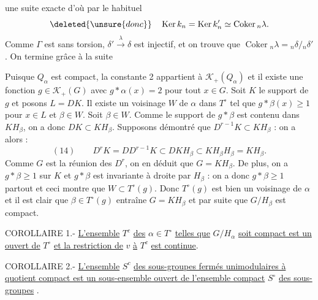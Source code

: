 une suite exacte
d'où par le  habituel
\[
\deleted{\unsure{donc}}\quad \operatorname{Ker}k_n=\operatorname{Ker}k'_n\simeq\operatorname{Coker}{}_n\lambda.
\]
Comme $\Gamma$ est sans torsion,  $\delta'\xrightarrow{\lambda}\delta$ est injectif, et on trouve que $\operatorname{Coker}{}_n\lambda={}_n\delta/{}_n\delta'$. On termine grâce à la suite

Puisque $Q_\alpha$ est compact, la constante 2 appartient à $\mathcal K_+(Q_\alpha)$ et il existe une fonction $g\in\mathcal K_+(G)$ avec $g*\alpha(x)=2$ pour tout $x\in G$. Soit $K$ le support de $g$ et posons $L=DK$. Il existe un voisinage $W$ de $\alpha$ dans $T^\circ$ tel que $g*\beta(x)\geq 1$ pour $x\in L$ et $\beta\in W$. Soit $\beta\in W$. Comme le support de $g*\beta$ est contenu dans $KH_\beta$, on a donc $DK\subset KH_\beta$. Supposons démontré que $D^{r-1}K\subset KH_\beta$ : on a alors :
\[
(14)\qquad D^rK=DD^{r-1}K\subset DKH_\beta\subset KH_\beta H_\beta=KH_\beta.
\]
Comme $G$ est la réunion des $D^r$, on en déduit que $G=KH_\beta$. De plus, on a $g*\beta\geq 1$ sur $K$ et $g*\beta$ est invariante à droite par $H_\beta$ : on a donc $g*\beta\geq 1$ partout et ceci montre que $W\subset T^\circ(g)$. Donc $T^\circ(g)$ est bien un voisinage de $\alpha$ et il est clair que $\beta\in T^\circ(g)$ entraîne $G=KH_\beta$ et par suite que $G/H_\beta$ est compact.

COROLLAIRE 1.- \uline{L'ensemble} $T^c$ \uline{des} $\alpha\in T^\circ$ \uline{telles que} $G/H_\alpha$ \uline{soit compact est un ouvert de} $T^\circ$ \uline{et la restriction de} $v$ \uline{à} $T^c$ \uline{est continue}.

COROLLAIRE 2.- \uline{L'ensemble} $S^c$ \uline{des sous-groupes fermés unimodulaires à quotient compact est un sous-ensemble ouvert de l'ensemble compact} $S^\circ$ \uline{des sous-groupes} .

